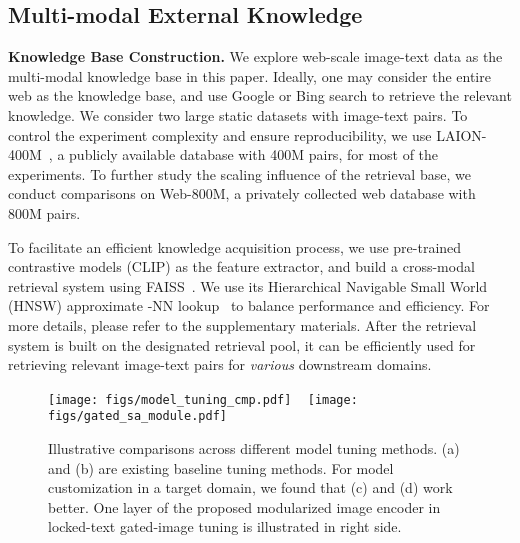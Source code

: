 \documentclass[10pt,twocolumn,letterpaper]{article}
\renewcommand{\paragraph}[1]{\vspace{1.25mm}\noindent\textbf{#1}}
\begin{document}
\subsection{Multi-modal External Knowledge}
\vspace{-2mm}
\paragraph{Knowledge Base Construction.}
We explore web-scale image-text data as the multi-modal knowledge base  in this paper. Ideally, one may consider the entire web as the  knowledge base, and use Google or Bing search to retrieve the relevant knowledge.
We consider two large static datasets with image-text pairs.  To control the experiment complexity and ensure reproducibility, we use LAION-400M~\cite{schuhmann2021laion}, a publicly available database with 400M pairs, for most of the experiments.  To further study the scaling influence of the retrieval base, we conduct comparisons on Web-800M, a privately collected web database with 800M pairs.

To facilitate an efficient knowledge acquisition process, we use pre-trained contrastive models (\eg CLIP) as the feature extractor, and build a cross-modal retrieval system using FAISS~\cite{johnson2019faiss}. We use its Hierarchical Navigable Small World (HNSW) approximate -NN lookup~\cite{malkov2018hnsw} to balance performance and efficiency.  For more details, please refer to the supplementary materials.
After the retrieval system is built on the designated retrieval pool, it can be efficiently used for retrieving relevant image-text pairs for \emph{various} downstream domains.


\begin{figure*}[ht!]\vspace{-0mm}\centering
\texttt{[image: figs/model\_tuning\_cmp.pdf]} ~
\texttt{[image: figs/gated\_sa\_module.pdf]} 
	\vspace{-2mm}
	\caption{Illustrative comparisons across different model tuning methods. (a) and (b) are existing baseline tuning methods. For model customization in a target domain, we found that (c) and (d) work better. One layer of the proposed  modularized image encoder in locked-text gated-image tuning is illustrated in right side.
	 }
	\vspace{-3mm}
	\label{fig:method_comparison}
\end{figure*}
\end{document}
